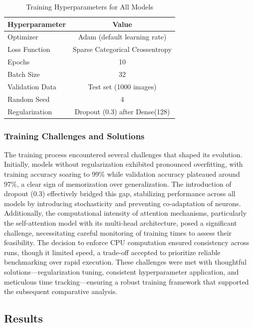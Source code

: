 \documentclass[12pt]{article}
\begin{document}
\begin{table}[H]
    \centering
    \caption{Training Hyperparameters for All Models}
    \label{tab:hyperparameters}
    \begin{tabular}{lc}
        \toprule
        \textbf{Hyperparameter} & \textbf{Value} \\
        \midrule
        Optimizer & Adam (default learning rate) \\
        Loss Function & Sparse Categorical Crossentropy \\
        Epochs & 10 \\
        Batch Size & 32 \\
        Validation Data & Test set (1000 images) \\
        Random Seed & 4 \\
        Regularization & Dropout (0.3) after Dense(128) \\
        \bottomrule
    \end{tabular}
\end{table}

\subsubsection{Training Challenges and Solutions}
The training process encountered several challenges that shaped its evolution. Initially, models without regularization exhibited pronounced overfitting, with training accuracy soaring to 99\% while validation accuracy plateaued around 97\%, a clear sign of memorization over generalization. The introduction of dropout (0.3) effectively bridged this gap, stabilizing performance across all models by introducing stochasticity and preventing co-adaptation of neurons. Additionally, the computational intensity of attention mechanisms, particularly the self-attention model with its multi-head architecture, posed a significant challenge, necessitating careful monitoring of training times to assess their feasibility. The decision to enforce CPU computation ensured consistency across runs, though it limited speed, a trade-off accepted to prioritize reliable benchmarking over rapid execution. These challenges were met with thoughtful solutions—regularization tuning, consistent hyperparameter application, and meticulous time tracking—ensuring a robust training framework that supported the subsequent comparative analysis.

\subsection{Results}
\end{document}
